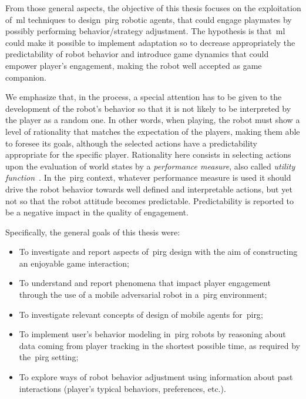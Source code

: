 From those general aspects, the objective of this thesis focuses on the exploitation of~\gls{ml} techniques to design~\gls{pirg} robotic agents, that could engage playmates by possibly performing behavior/strategy adjustment. The hypothesis is that~\gls{ml} could make it possible to implement adaptation so to decrease appropriately the predictability of robot behavior and introduce game dynamics that could empower player’s engagement, making the robot well accepted as game companion.

We emphasize that, in the process, a special attention has to be given to the development of the robot's behavior so that it is not likely to be interpreted by the player as a random one. In other words, when playing, the robot must show a level of rationality that matches the expectation of the players, making them able to foresee its goals, although the selected actions have a predictability appropriate for the specific player. Rationality here consists in selecting actions upon the evaluation of world states by a \textit{performance measure}, also called \textit{utility function}~\citep{russell_artificial_2009}. In the~\gls{pirg} context, whatever performance measure is used it should drive the robot behavior towards well defined and interpretable actions, but yet not so that the robot attitude becomes predictable. Predictability is reported to be a negative impact in the quality of engagement.   

Specifically, the general goals of this thesis were:

\begin{itemize}
\item To investigate and report aspects of~\gls{pirg} design with the aim of constructing an enjoyable game interaction; 
\item To understand and report phenomena that impact player engagement through the use of a mobile adversarial robot in a~\gls{pirg} environment;
\item To investigate relevant concepts of design of mobile agents for~\gls{pirg};
\item To implement user's behavior modeling in~\gls{pirg} robots by reasoning about data coming from player tracking in the shortest possible time, as required by the~\gls{pirg} setting;
\item To explore ways of robot behavior adjustment using information about past interactions (player's typical behaviors, preferences, etc.).
\end{itemize}

